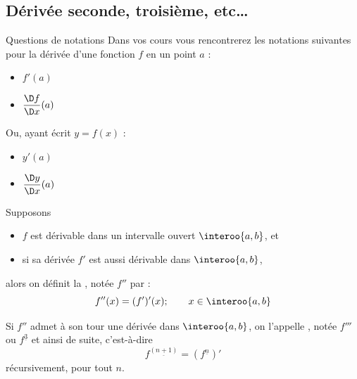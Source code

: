 \subsection{Dérivée seconde, troisième, etc\ldots}
\begin{frame}{Questions de notations}%
  Dans vos cours vous rencontrerez les notations suivantes pour la dérivée d'une fonction \(f\) en un point \(a\) :
\begin{itemize}[<+->]
\item \(f'(a)\)
\item \(\dfrac{\D f}{\D x}(a)\)
\end{itemize}\pause
Ou, ayant écrit \(y = f(x)\) :
\begin{itemize}[<+->]
\item \(y'(a)\)
\item \(\dfrac{\D y}{\D x}(a)\)
\end{itemize}
\end{frame}

\begin{frame}
  Supposons\pause
  \begin{itemize}[<+->]
  \item $f$ est dérivable dans un intervalle ouvert $\interoo{a,b}$, et
  \item si sa dérivée $f'$ est aussi dérivable dans $\interoo{a,b}$,
  \end{itemize}\pause
  alors on définit la , notée $f''$ par :
  \begin{equation*}
    f''(x) = (f')'(x); \qquad x \in \interoo{a,b}
  \end{equation*}\pause
  
  Si $f''$ admet à son tour une dérivée dans $\interoo{a,b}$, on l'appelle , notée $f'''$ ou $f^{\underline{3}}$ et ainsi de suite, c'est-à-dire
  \begin{equation*}
    f^{\underline{(n+1)}}=(f^{\underline{n}})'
  \end{equation*}
  récursivement, pour tout \(n\).
\end{frame}

